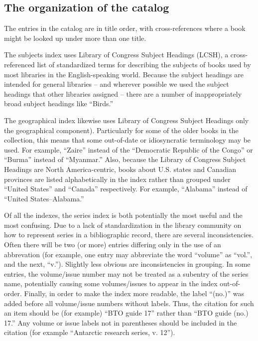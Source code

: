 \subsection*{The organization of the catalog}

The entries in the catalog are in title order, with cross-references where a
book might be looked up under more than one title.

The subjects index uses Library of Congress Subject Headings (LCSH), a
cross-referenced list of standardized terms for describing the subjects of books
used by most libraries in the English-speaking world. Because the subject headings
are intended for general libraries -- and wherever possible we used the subject
headings that other libraries assigned -- there are a number of inappropriately
broad subject headings like ``Birds.''

The geographical index likewise uses Library of Congress Subject Headings only
the geographical component). Particularly for some of the older books in the
collection, this means that some out-of-date or idiosyncratic terminology may be
used. For example, ``Zaire'' instead of the ``Democratic Republic of the Congo''
or ``Burma'' instead of ``Myanmar.'' Also, because the Library of Congress
Subject Headings are North America-centric, books about U.S. states and Canadian
provinces are listed alphabetically in the index rather than grouped under
``United States'' and ``Canada'' respectively. For example, ``Alabama'' instead
of ``United States--Alabama.''

Of all the indexes, the series index is both potentially the most useful and
the most confusing. Due to a lack of standardization in the library community
on how to represent series in a bibliographic record, there are several
inconsistencies. Often there will be two (or more) entries differing only in
the use of an abbrevation (for example, one entry may abbreviate the word
``volume'' as ``vol.'', and the next, ``v.''). Slightly less obvious are
inconsistencies in grouping. In some entries, the volume/issue number may not
be treated as a subentry of the series name, potentially causing some
volumes/issues to appear in the index out-of-order.  Finally, in order to make
the index more readable, the label ``(no.)'' was added before all volume/issue
numbers without labels. Thus, the citation for such an item should be (for
example) ``BTO guide 17'' rather than ``BTO guide (no.) 17.'' Any volume or issue
labels not in parentheses should be included in the citation (for example
``Antarctic research series, v. 12'').

